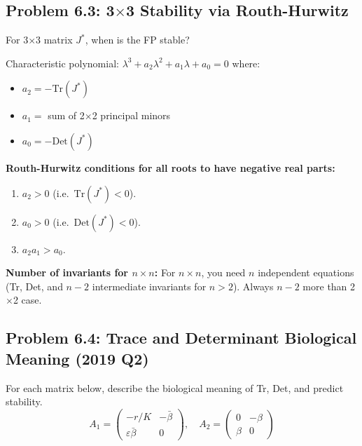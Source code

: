 \documentclass[10pt]{article}
\begin{document}
\subsection{Problem 6.3: 3$\times$3 Stability via Routh-Hurwitz}

\begin{problem}
For 3$\times$3 matrix $J^*$, when is the FP stable?
\end{problem}

\begin{solution}
Characteristic polynomial: $\lambda^3 + a_2\lambda^2 + a_1 \lambda + a_0 = 0$ where:
\begin{itemize}
\item $a_2 = -\text{Tr}(J^*)$
\item $a_1 = $ sum of 2$\times$2 principal minors
\item $a_0 = -\text{Det}(J^*)$
\end{itemize}
\textbf{Routh-Hurwitz conditions for all roots to have negative real parts:}
\begin{enumerate}
\item $a_2 > 0$ (i.e.\ $\text{Tr}(J^*) < 0$).
\item $a_0 > 0$ (i.e.\ $\text{Det}(J^*) < 0$).
\item $a_2 a_1 > a_0$.
\end{enumerate}

\textbf{Number of invariants for $n \times n$:} For $n \times n$, you need $n$ independent equations (Tr, Det, and $n-2$ intermediate invariants for $n > 2$). Always $n-2$ more than 2$\times$2 case.
\end{solution}

\subsection{Problem 6.4: Trace and Determinant Biological Meaning (2019 Q2)}

\begin{problem}
For each matrix below, describe the biological meaning of Tr, Det, and predict stability.
\[
A_1 = \begin{pmatrix} -r/K & -\bar\beta \\ \varepsilon\bar\beta & 0 \end{pmatrix}, \quad
A_2 = \begin{pmatrix} 0 & -\beta \\ \beta & 0 \end{pmatrix}
\]
\end{problem}
\end{document}
